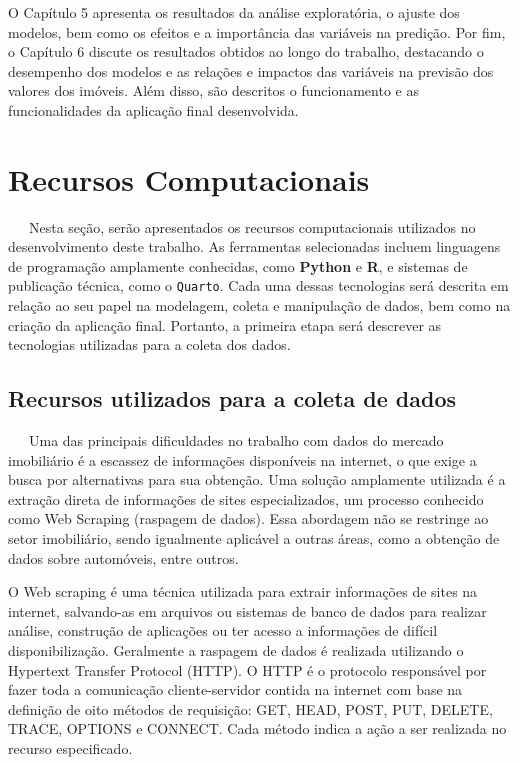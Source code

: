 \documentclass[
  12pt,
  a4paper,
]{scrreprt}
\begin{document}
\vspace{12pt}

O Capítulo 5 apresenta os resultados da análise exploratória, o ajuste
dos modelos, bem como os efeitos e a importância das variáveis na
predição. Por fim, o Capítulo 6 discute os resultados obtidos ao longo
do trabalho, destacando o desempenho dos modelos e as relações e
impactos das variáveis na previsão dos valores dos imóveis. Além disso,
são descritos o funcionamento e as funcionalidades da aplicação final
desenvolvida.

\chapter{Recursos Computacionais}\label{recursos-computacionais}

~~~Nesta seção, serão apresentados os recursos computacionais utilizados
no desenvolvimento deste trabalho. As ferramentas selecionadas incluem
linguagens de programação amplamente conhecidas, como \textbf{Python} e
\textbf{R}, e sistemas de publicação técnica, como o \texttt{Quarto}.
Cada uma dessas tecnologias será descrita em relação ao seu papel na
modelagem, coleta e manipulação de dados, bem como na criação da
aplicação final. Portanto, a primeira etapa será descrever as
tecnologias utilizadas para a coleta dos dados.

\section{Recursos utilizados para a coleta de
dados}\label{recursos-utilizados-para-a-coleta-de-dados}

~~~Uma das principais dificuldades no trabalho com dados do mercado
imobiliário é a escassez de informações disponíveis na internet, o que
exige a busca por alternativas para sua obtenção. Uma solução amplamente
utilizada é a extração direta de informações de sites especializados, um
processo conhecido como Web Scraping (raspagem de dados). Essa abordagem
não se restringe ao setor imobiliário, sendo igualmente aplicável a
outras áreas, como a obtenção de dados sobre automóveis, entre outros.

\vspace{12pt}

O Web scraping é uma técnica utilizada para extrair informações de sites
na internet, salvando-as em arquivos ou sistemas de banco de dados para
realizar análise, construção de aplicações ou ter acesso a informações
de difícil disponibilização. Geralmente a raspagem de dados é realizada
utilizando o Hypertext Transfer Protocol (HTTP). O HTTP é o protocolo
responsável por fazer toda a comunicação cliente-servidor contida na
internet com base na definição de oito métodos de requisição: GET, HEAD,
POST, PUT, DELETE, TRACE, OPTIONS e CONNECT. Cada método indica a ação a
ser realizada no recurso especificado.
\end{document}
